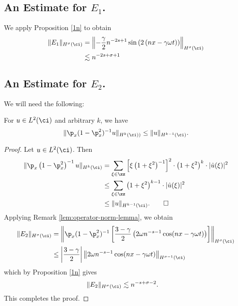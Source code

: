 	\subsection{An Estimate for $\hyperref[90*]{E_1}$.}
	We apply Proposition \ref{1n} to obtain
	\begin{equation}
		\label{85}
		\begin{split}
			\|E_1\|_{H^\sigma(\ci)}
			& = 
			\left\| - \frac{\gamma}{2}n^{-2s+1}\sin\left( 2\left(
			nx - \gamma \omega t \right)\right )
			\right\|_{H^\sigma(\ci)}
			\\
			& \lesssim
			n^{-2s + \sigma + 1}
		\end{split}
	\end{equation}
	\subsection{An Estimate for $\hyperref[90**]{E_2}$.}
	We will need the following:
	\begin{remark}
		\label{lem:operator-norm-lemma}
		For $u \in L^2(\ci)$ and arbitrary $k$, we have
		\begin{equation}
			\begin{split}
				\|\p_x (1 -\p_x^2)^{-1}u \|_{H^{k}(\ci))} \le
				\|u\|_{H^{k-1}(\ci)}.
				\label{operator norm of pseudo-diff operator we use}
			\end{split}
		\end{equation}
	\end{remark}
	\begin{proof} Let $u \in L^2(\ci)$. Then
	\begin{equation*}
		\begin{split}
			\|\p_x \left( 1- \p_x^2 \right)^{-1} u \|_{H^{k}(\ci)}
			& = \sum_{\xi \in \zz}  \left[ \xi\left( 1+\xi^2 \right)^{-1} \right]^2
			\cdot \left( 1 + \xi^2 \right)^{k} \cdot |\hat{u}(\xi)|^2 
			\\
			& \le \sum_{\xi \in \zz}  \left( 1+ \xi^2 \right)^{k-1} \cdot 
			|\hat{u}(\xi)|^2 
			\\
			& \le \|u\|_{H^{k-1}(\ci)}.
			\qquad \Box
		\end{split}
	\end{equation*}
	Applying Remark \ref{lem:operator-norm-lemma}, we obtain
		\begin{equation}
		\begin{split}
			 \|E_2\|_{H^\sigma(\ci)} & = \left \|\p_x(1-\p_x^2)^{-1}
			\left[ \frac{3-\gamma}{2}
			\left( 2 \omega n^{-s -1}\cos( nx - \gamma \omega t )
			\right) \right] \right \|_{H^\sigma(\ci)}
			\\
			& \le \left |\frac{3-\gamma}{2}\right |
			\left \|2 \omega n^{-s -1}\cos( nx - \gamma \omega t )
			\right \|_{H^{\sigma -1 }(\ci)}
			\label{non-local_term_first_piece_without_constant}
		\end{split}
	\end{equation}
	which by Proposition \ref{1n} gives
		\begin{equation}
			\label{3.10}
		\begin{split}
			\|E_2\|_{H^\sigma(\ci)}
			& \lesssim n^{-s + \sigma -2}.
		\end{split}
	\end{equation}
  This completes the proof. 
\end{proof}

